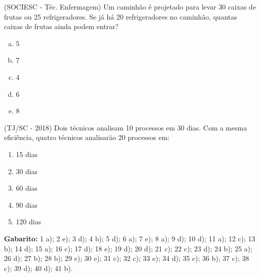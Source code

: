  \begin{exer} (SOCIESC - Téc. Enfermagem) Um caminhão é projetado para levar 30 caixas de frutas ou 25 refrigeradores. Se já há 20 refrigeradores no caminhão, quantas caixas de frutas ainda podem entrar?
 \begin{enumerate}[a)]
  \item 5
  \item 7
  \item 4
  \item 6
  \item 8
 \end{enumerate}
 \end{exer}

 \begin{exer} (TJ/SC - 2018) Dois técnicos analisam 10 processos em 30 dias. Com a mesma eficiência, quatro técnicos analisarão 20 processos em:
    \begin{enumerate}
    \item 15 dias
    \item 30 dias
    \item 60 dias
    \item 90 dias
    \item 120 dias
    \end{enumerate}
\end{exer}

 \textbf{Gabarito:} 1 a); 2 e); 3 d); 4 b); 5 d); 6 a); 7 e); 8 a); 9 d); 10 d); 11 a); 12 c); 13 b); 14 d); 15 a); 16 c); 17 d); 18 e); 19 d); 20 d); 21 c); 22 c); 23 d); 24 b); 25 a); 26 d); 27 b); 28 b); 29 e); 30 e); 31 c); 32 c); 33 e); 34 d); 35 c); 36 b); 37 c); 38 c); 39 d); 40 d); 41 b).
